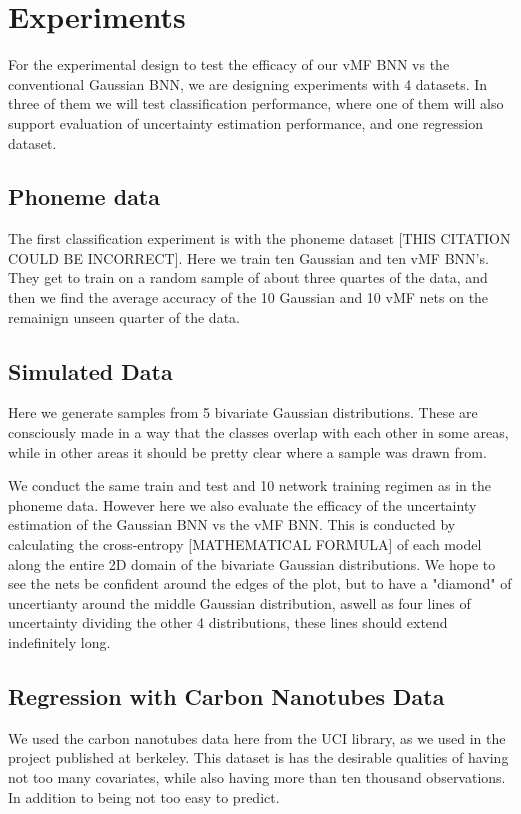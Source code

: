 \documentclass[nofootinbib,UKenglish,nobalancelastpage,12pt]{article}
\begin{document}
\section{Experiments}

For the experimental design to test the efficacy of our vMF BNN vs the conventional Gaussian BNN, we are designing experiments with 4 datasets. In three of them we will test classification performance, where one of them will also support evaluation of uncertainty estimation performance, and one regression dataset. 


\subsection{Phoneme data}
The first classification experiment is with the phoneme dataset \cite{Phonemedata_Hastie1995} [THIS CITATION COULD BE INCORRECT]. Here we train ten Gaussian and ten vMF BNN's. They get to train on a random sample of about three quartes of the data, and then we find the average accuracy of the 10 Gaussian and 10 vMF nets on the remainign unseen quarter of the data.

\subsection{Simulated Data}

Here we generate samples from 5 bivariate Gaussian distributions. These are consciously made in a way that the classes overlap with each other in some areas, while in other areas it should be pretty clear where a sample was drawn from. 

We conduct the same train and test and 10 network training regimen as in the phoneme data. However here we also evaluate the efficacy of the uncertainty estimation of the Gaussian BNN vs the vMF BNN. This is conducted by calculating the cross-entropy [MATHEMATICAL FORMULA] of each model along the entire 2D domain of the bivariate Gaussian distributions. We hope to see the nets be confident around the edges of the plot, but to have a "diamond" of uncertianty around the middle Gaussian distribution, aswell as four lines of uncertainty dividing the other 4 distributions, these lines should extend indefinitely long.

\subsection{Regression with Carbon Nanotubes Data}

We used the carbon nanotubes data here from the UCI library, as we used in the project published at berkeley. \cite{CarbonNanotubes1}\cite{CarbonNanotubes2} This dataset is has the desirable qualities of having not too many covariates, while also having more than ten thousand observations. In addition to being not too easy to predict. 
\end{document}
